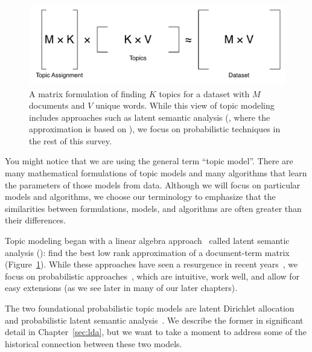 \begin{center}
\begin{figure}
  \begin{center}
  \includegraphics[width=.8\linewidth]{figures/matrix_factorization}
  \end{center}

  \caption{A matrix formulation of finding $K$ topics for a dataset
    with $M$ documents and $V$ unique words.  While this view of topic
    modeling includes approaches such as latent semantic analysis
    (, where the approximation is based on ), we
    focus on probabilistic techniques in the rest of this survey.}
  \label{fig:matrix_topics}
\end{figure}
\end{center}

You might notice that we are using the general term ``topic model''.
There are many mathematical formulations of topic models and many algorithms that learn the parameters of those models from data.
Although we will focus on particular models and algorithms, we choose our terminology to emphasize that the similarities between formulations, models, and algorithms are often greater than their differences.

Topic modeling began with a linear algebra approach~\citep{deerwester-90} called
latent semantic analysis (): find the best low rank approximation of a
document-term matrix (Figure~\ref{fig:matrix_topics}).  While these approaches
have seen a resurgence in recent years~\citep{anandkumar-12,arora-13}, we
focus on probabilistic approaches~\citep{hofmann-99,papadimitriou-00,blei-03},
which are intuitive, work well, and allow for
easy extensions (as we see later in many of our later chapters).

The two foundational probabilistic topic models are latent Dirichlet
allocation~\citep[]{blei-03} and probabilistic latent
semantic analysis~\citep[\plsa{}]{hofmann-99}.  We describe the
former in significant detail in Chapter~\ref{sec:lda}, but we want to
take a moment to address some of the historical connection between
these two models.


